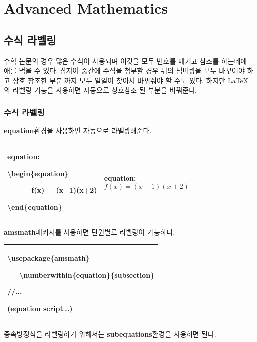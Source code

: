 \documentclass[12pt]{article}
\begin{document}
	\section{Advanced Mathematics}
	\label{se:eq_label}
	\subsection{수식 라벨링}
	수학 논문의 경우 많은 수식이 사용되며 이것을 모두 번호를 매기고 참조를 하는데에 애를 먹을 수 있다. 심지어 중간에 수식을 첨부할 경우 뒤의 넘버링을 모두 바꾸어야 하고 상호 참조한 부분 까지 모두 일일이 찾아서 바꿔줘야 할 수도 있다. 하지만 \LaTeX 의 라벨링 기능을 사용하면 자동으로 상호참조 된 부분을 바꿔준다.
	\subsubsection{수식 라벨링}
	\textbf{equation}환경을 사용하면 자동으로 라벨링\를 해준다.\newline
	
	\begin{tabularx}{\textwidth\onehalfspacing}{|X|X|}
		\hline
		equation:
		
		\textbackslash begin\{equation\}
		
		\ \ \ \ \ \ f(x) = (x+1)(x+2)
		
		\textbackslash end\{equation\}
		&equation:
		\begin{equation}
			f(x) = (x+1)(x+2)
		\end{equation}\\
		\hline
	\end{tabularx}
	\newline\newline
	\textbf{amsmath}패키지를 사용하면 단원별로 라벨링이 가능하다. \newline
	
	\begin{tabularx}{\textwidth\onehalfspacing}{|X|}
		\hline
		\textbackslash usepackage\{amsmath\}
		
		\ \ \ \textbackslash numberwithin\{equation\}\{subsection\}
		
		//...
		
		(equation script...)\\
		\hline
	\end{tabularx}
	\newline\newline
	종속방정식을 라벨링하기 위해서는 \textbf{subequations}환경을 사용하면 된다.\newline
	
\end{document}
